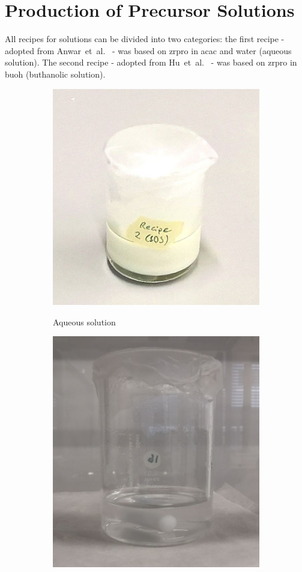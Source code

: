 \section{Production of Precursor Solutions}
\label{sec:exp-sol}
All recipes for solutions can be divided into two categories:
the first recipe - adopted from Anwar~et~al.~\cite{Anwar2017} - was based on \gls{zrpro} in \gls{acac} and \gls{water} (aqueous solution).
The second recipe - adopted from Hu~et~al.~\cite{Hu2016} - was based on \gls{zrpro} in \gls{buoh} (buthanolic solution).

\iffalse
\begin{figure}[htb]
	\centering
	\begin{subfigure}{0.49\textwidth}
		\centering
		\includegraphics[height=0.8\textwidth]{Pics/sol-aq.png}
		\label{fig:sol-aq}
		\caption{Aqueous solution}
	\end{subfigure}
	\begin{subfigure}{0.49\textwidth}
		\centering
		\includegraphics[height=0.8\textwidth]{Pics/sol-bu.png}

\end{subfigure}
\end{figure}

